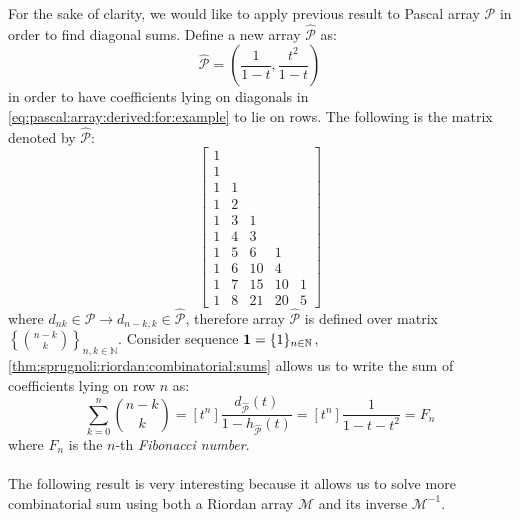 For the sake of clarity, we would like to apply previous result to
Pascal array $\mathcal{P}$ in order to find diagonal sums. Define
a new array $\hat{\mathcal{P}}$ as:
\begin{equation}
    \hat{\mathcal{P}}=\left(\frac{1}{1-t},\frac{t^{2}}{1-t}\right)
    \label{eq:pascal:array:for:diagonals}
\end{equation}
in order to have coefficients lying on diagonals in \autoref{eq:pascal:array:derived:for:example}
to lie on rows. The following is the matrix denoted by $\hat{\mathcal{P}}$:
\begin{displaymath} 
    \left[
    \begin{array}{rrrrr}
    1 &  &  &  &   \\
    1 &  &  &  &   \\
    1 & 1 &  &  &   \\
    1 & 2 &  &  &   \\
    1 & 3 & 1 &  &   \\
    1 & 4 & 3 &  &   \\
    1 & 5 & 6 & 1 &   \\
    1 & 6 & 10 & 4 &  \\
    1 & 7 & 15 & 10 & 1 \\
    1 & 8 & 21 & 20 & 5 
    \end{array}
    \right] 
\end{displaymath}
where $d_{nk}\in\mathcal{P} \rightarrow d_{n-k,k}\in\hat{\mathcal{P}}$, 
therefore array $\hat{\mathcal{P}}$ is defined over matrix 
$\left\lbrace{{n-k}\choose{k}}\right\rbrace_{n,k\in\mathbb{N}}$.
Consider sequence $\boldsymbol{1}=\lbrace1\rbrace_{n\in\mathbb{N}}$, 
\autoref{thm:sprugnoli:riordan:combinatorial:sums} allows us to write the sum
of coefficients lying on row $n$ as:
\begin{displaymath}
    \sum_{k=0}^{n}{{{n-k}\choose{k}}}=[t^{n}]
        \frac{d_{\hat{\mathcal{P}}}(t)}{1-h_{\hat{\mathcal{P}}}(t)}
        =[t^{n}]\frac{1}{1-t-t^{2}}
        =F_{n}
\end{displaymath}
where $F_{n}$ is the $n$-th \emph{Fibonacci number}.
\\\\
The following result is very interesting because it allows us to solve
more combinatorial sum using both a Riordan array $\mathcal{M}$
and its inverse $\mathcal{M}^{-1}$.


